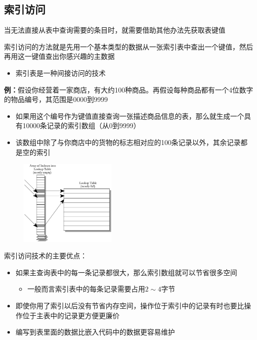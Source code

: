 \subsection{索引访问}
当无法直接从表中查询需要的条目时，就需要借助其他办法先获取表键值

索引访问的方法就是先用一个基本类型的数据从一张索引表中查出一个键值，然后再用这一键值查出你感兴趣的主数据
\begin{itemize}
    \item 索引表是一种间接访问的技术
\end{itemize}

\textbf{例：}假设你经营着一家商店，有大约100种商品。再假设每种商品都有一个4位数字的物品编号，其范围是0000到9999
\begin{itemize}
    \item 如果用这个编号作为键值直接查询一张描述商品信息的表，那么就生成一个具有10000条记录的索引数组（从0到9999）
    \item 该数组中除了与你商店中的货物的标志相对应的100条记录以外，其余记录都是空的索引
\end{itemize}

\begin{figure}[H]
    \vspace{-0.5em}
	\centering
	\includegraphics[width=0.42\textwidth]{images/索引访问.png}
    \vspace{-1em}
\end{figure}

索引访问技术的主要优点：
\begin{itemize}
    \item 如果主查询表中的每一条记录都很大，那么索引数组就可以节省很多空间
    \begin{itemize}
        \item 一般而言索引表中的每条记录需要占用$2\sim 4$字节
    \end{itemize}
    \item 即使你用了索引以后没有节省内存空间，操作位于索引中的记录有时也要比操作位于主表中的记录更方便更廉价
    \item 编写到表里面的数据比嵌入代码中的数据更容易维护
\end{itemize}


